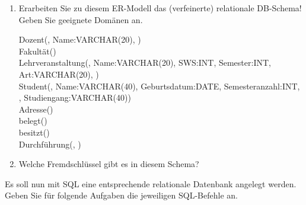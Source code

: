 \documentclass{lehramt-informatik-aufgabe}
\begin{document}
\renewcommand{\labelenumi}{(\alph{enumi})}
\begin{enumerate}
\item Erarbeiten Sie zu diesem ER-Modell das (verfeinerte) relationale
DB-Schema! Geben Sie geeignete
Domänen an.

\begin{liAntwort}
\ttfamily
\footnotesize
Dozent(, Name:VARCHAR(20),
)\\

Fakultät()\\

Lehrveranstaltung(, Name:VARCHAR(20), SWS:INT,
Semester:INT, Art:VARCHAR(20), )\\

Student(, Name:VARCHAR(40), Geburtsdatum:DATE,
Semesteranzahl:INT, ,
Studiengang:VARCHAR(40))\\

Adresse()\\

belegt()\\

besitzt()\\

Durchführung(, )\\
\end{liAntwort}

\item Welche Fremdschlüssel gibt es in diesem Schema?
\end{enumerate}

\noindent
Es soll nun mit SQL eine entsprechende relationale Datenbank
angelegt werden. Geben Sie für folgende Aufgaben die jeweiligen
SQL-Befehle an.
\end{document}
